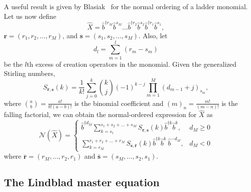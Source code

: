 \documentclass[onecolumn, 12pt, sort&compress]{elsarticle}
\newcounter{bla}
\newcommand{\bop}{\hat{b}}
\newcommand{\bdagn}[1]{\bop^{\dagger {#1}}}
\begin{document}
A useful result is given by Blasiak~\cite{blasiak_combinatorics_2005, Mendez_2005} for the normal ordering of a ladder monomial. Let us now define
\begin{equation}
    \hat{X} = \bdagn{r_M}\bop^{s_M}\dots \bdagn{r_2}\bop^{s_2}\bdagn{r_1}\bop^{s_1} ,
\end{equation} 
$\bm{r}=\left(r_1,r_2,\dots,r_M\right)$, and $\bm{s}=\left(s_1,s_2,\dots,s_M\right)$.  Also, let 
\begin{equation}
    d_l = \sum_{m=1}^l\left(r_m-s_m\right)
\end{equation}
be the $l$th excess of creation operators in the monomial.  Given  the generalized Stirling numbers,
\begin{equation}\label{eq:S_rsk}
    S_{\bm{r},\bm{s}}(k) = \frac{1}{k!}\sum_{j=0}^k \binom{k}{j}\left(-1\right)^{k-j}\prod_{m=1}^M \left(d_{m-1}+j\right)_{s_m},
\end{equation}
where $\binom{a}{b}=\frac{a!}{b!(a-b)!}$ is the binomial coefficient and $(m)_n=\frac{m!}{(m-n)!}$ is the falling factorial, we can obtain the normal-ordered expression for $\hat{X}$ as 
\begin{equation}\label{eq:Blasiak}
    \mathcal{N}\left(\hat{X}\right) = 
    \begin{cases}\displaystyle
        \bdagn{d_M}\sum_{k=s_1}^{s_1+s_2+\dots+s_M} S_{\bm{r},\bm{s}}(k)\bdagn{k}\bop^k,
        &
        d_M \geq 0
        \\
        \displaystyle
        \sum_{k=r_M}^{r_1+r_2+\dots+r_M} S_{\overline{\bm{s}},\overline{\bm{r}}}(k)\bdagn{k}\bop^k\ \bop^{-d_M},
        &
        d_M<0
    \end{cases}
\end{equation}
where $\overline{\bm{r}}=\left(r_M,\dots,r_2,r_1\right)$ and $\overline{\bm{s}}=\left(s_M,\dots,s_2,s_1\right)$. 


\subsection{The Lindblad master equation}\label{subsec:LindbladME}
\end{document}
